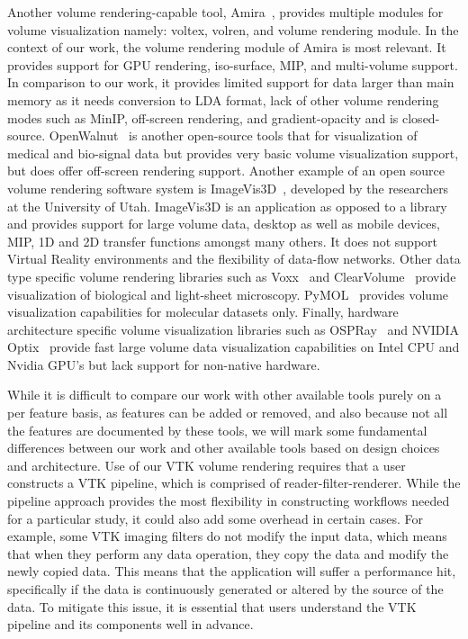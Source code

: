 Another volume rendering-capable tool, Amira~\citep{stalling2005amira}, provides
multiple modules for volume visualization namely: voltex, volren, and volume
rendering module. In the context of our work, the volume rendering module of
Amira is most relevant. It provides support for GPU rendering, iso-surface, MIP,
and multi-volume support. In comparison to our work, it provides limited support
for data larger than main memory as it needs conversion to LDA format, lack of
other volume rendering modes such as MinIP, off-screen rendering, and
gradient-opacity and is closed-source.
OpenWalnut~\citep{eichelbaum2010openwalnut} is another open-source tools that
for visualization of medical and bio-signal data but provides very basic volume
visualization support, but does offer off-screen rendering support. Another
example of an open source volume rendering software system is
ImageVis3D~\citep{cibc_imagevis3D:_2016}, developed by the researchers at the
University of Utah. ImageVis3D is an application as opposed to a library and
provides support for large volume data, desktop as well as mobile devices, MIP,
1D and 2D transfer functions amongst many others.  It does not support Virtual
Reality environments and the flexibility of data-flow networks. Other data type
specific volume rendering libraries such as Voxx~\citep{clendenon_voxx:_2002}
and ClearVolume~\citep{royer_clearvolume:_2015} provide visualization of
biological and light-sheet microscopy.  PyMOL~\citep{schrodinger_llc_pymol_2015}
provides volume visualization capabilities for molecular datasets only. Finally,
hardware architecture specific volume visualization libraries such as
OSPRay~\citep{wald_ospray_2017} and NVIDIA\textsuperscript{\textregistered}
Optix\textsuperscript{\texttrademark}~\citep{parker_optix:_2010} provide fast
large volume data visualization capabilities on Intel CPU and Nvidia GPU's but
lack support for non-native hardware.

While it is difficult to compare our work with other available tools purely on a
per feature basis, as features can be added or removed, and also because not all
the features are documented by these tools, we will mark some fundamental
differences between our work and other available tools based on design choices
and architecture. Use of our VTK volume rendering requires that a user
constructs a VTK pipeline, which is comprised of reader-filter-renderer. While
the pipeline approach provides the most flexibility in constructing workflows
needed for a particular study, it could also add some overhead in certain cases.
For example, some VTK imaging filters do not modify the input data, which means
that when they perform any data operation, they copy the data and modify the
newly copied data. This means that the application will suffer a performance
hit, specifically if the data is continuously generated or altered by the source
of the data. To mitigate this issue, it is essential that users understand the
VTK pipeline and its components well in advance.

